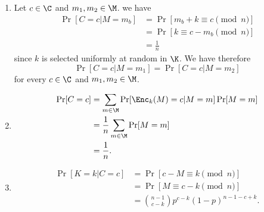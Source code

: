\section{}
\subsection{}
\begin{solution}
  \begin{enumerate}
    \item
      Let $c \in \C$ and $m_1,m_2 \in \M$.
      we have
      \begin{align*}
        \Pr[C = c | M = m_b]
        & = \Pr[m_b + k \equiv c \pmod{n}]\\
        & = \Pr[k \equiv c - m_b \pmod{n}]\\
        & = \frac{1}{n}
      \end{align*}
      since $k$ is selected uniformly at random in $\K$.
      We have therefore
      \[
        \Pr[C = c | M = m_1] = \Pr[C = c | M = m_2]
      \]
      for every $c \in \C$ and $m_1,m_2 \in \M$.
    \item
      \begin{align*}
        \Pr[C = c]
        & = \sum_{m \in \M} \Pr[\Enc_k(M) = c | M = m] \Pr[M = m]\\
        & = \frac{1}{n} \sum_{m \in \M} \Pr[M = m]\\
        & = \frac{1}{n}.
      \end{align*}
    \item
      \begin{align*}
        \Pr[K = k | C = c]
        & = \Pr[c - M \equiv k \pmod{n}]\\
        & = \Pr[M \equiv c - k \pmod{n}]\\
        & = {n-1 \choose c-k} p^{c-k} (1-p)^{n-1-c+k}.
      \end{align*}
  \end{enumerate}
\end{solution}

